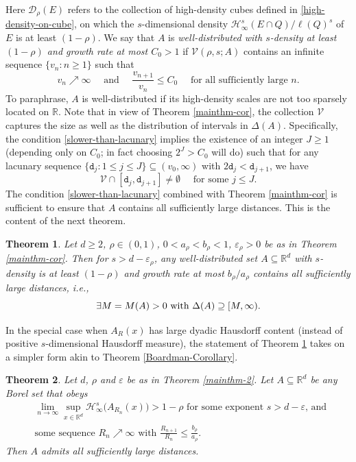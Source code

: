 \documentclass[a4paper,11pt]{amsart}
\newtheorem{thm}{\bf Theorem}[section]
\numberwithin{equation}{section}
\begin{document}
Here $\mathcal D_{\rho}(E)$ refers to the collection of high-density cubes defined in \eqref{high-density-on-cube}, on which the $s$-dimensional density $\mathcal H_{\infty}^{s}(E \cap Q)/\ell(Q)^s$ of $E$ is at least $(1 - \rho)$. We say that $A$ is {\em{well-distributed with $s$-density at least $(1 - \rho)$ and growth rate at most $C_0 > 1$}} if  $\mathscr V(\rho,s;A)$ contains an infinite sequence $\{v_n: n \geq 1\}$ such that 
\begin{equation} \label{slower-than-lacunary} v_n \nearrow \infty \quad \text{ and } \quad \frac{v_{n+1}}{v_n} \leq C_0 \quad \text{ for all sufficiently large $n$.} \end{equation}   
To paraphrase, $A$ is well-distributed if its high-density scales are not too sparsely located on $\mathbb R$. Note that in view of Theorem \ref{mainthm-cor}, the collection $\mathscr V$ captures the size as well as the distribution of intervals in $\Delta(A)$. Specifically, the condition \eqref{slower-than-lacunary} implies the existence of an integer $J \geq 1$ (depending only on $C_0$; in fact choosing $2^J > C_0$ will do) such that for any lacunary sequence $\{\mathtt d_j : 1 \leq j \leq J \} \subseteq (v_0, \infty)$ with  $2\mathtt d_{j} < \mathtt d_{j+1}$, we have  
\[ \mathscr{V} \cap [\mathtt d_j, \mathtt d_{j+1}] \ne \emptyset \quad \text{ for some $j \leq J$.} \]    
The condition \eqref{slower-than-lacunary} combined with Theorem \ref{mainthm-cor} is sufficient to ensure that $A$ contains all sufficiently large distances. This is the content of the next theorem. 
\begin{thm} \label{mainthm-3}
Let $d \geq 2$, $\rho \in (0, 1)$, $0 < a_{\rho} < b_{\rho}< 1$, $\varepsilon_{\rho} > 0$ be as in Theorem \ref{mainthm-cor}. Then for $s > d - \varepsilon_{\rho}$, any well-distributed set $A \subseteq \mathbb R^d$ with $s$-density is at least $(1 - \rho)$ and growth rate at most $b_{\rho}/a_{\rho}$ contains all sufficiently large distances, i.e., 
\[ \text{$ \exists M = M(A) > 0$ with $\Delta(A) \supseteq [M, \infty)$.} \]
\end{thm} 
\noindent In the special case when $A_R(x)$ has large dyadic Hausdorff content (instead of positive $s$-dimensional Hausdorff measure), the statement of 
Theorem \ref{mainthm-3} takes on a simpler form akin to Theorem \ref{Boardman-Corollary}.  
\begin{thm}\label{mainthm-4} 
Let $d$, $\rho$ and $\varepsilon$ be as in Theorem \ref{mainthm-2}. 
Let $A \subseteq \mathbb R^d$ be any Borel set that obeys  
  \begin{align} 
&  \lim_{n \rightarrow \infty} \sup_{x \in \mathbb R^d} \mathcal H^s_{\infty}\bigl(A_{R_n}(x)\bigr) > 1 - \rho \text{ for some exponent $s > d - \varepsilon$, and } \label{ARn-large} \\ 
&  \text{some sequence $R_n \nearrow \infty$ with } \frac{R_{n+1}}{R_n} \leq \frac{b_{\rho}}{a_{\rho}}.   \label{Rn-growth} 
  \end{align}  
Then $A$ admits all sufficiently large distances.   
\end{thm} 
\end{document}
